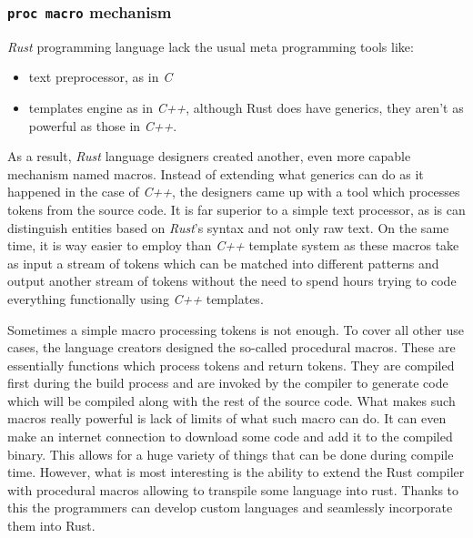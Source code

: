 \subsubsection{\texttt{proc macro} mechanism}
\textit{Rust} programming language lack the usual meta programming tools like:
\begin{itemize}
    \item text preprocessor, as in \textit{C}
    \item templates engine as in \textit{C++}, although Rust does have generics, they aren't as powerful as those in \textit{C++}.
\end{itemize}
As a result, \textit{Rust} language designers created another, even more capable mechanism named macros. Instead of extending what generics can do as it happened in the case of \textit{C++}, the designers came up with a tool which processes tokens from the source code. It is far superior to a simple text processor, as is can distinguish entities based on \textit{Rust}'s syntax and not only raw text. On the same time, it is way easier to employ than \textit{C++} template system as these macros take as input a stream of tokens which can be matched into different patterns and output another stream of tokens without the need to spend hours trying to code everything functionally using \textit{C++} templates. 

Sometimes a simple macro processing tokens is not enough. To cover all other use cases, the language creators designed the so-called procedural macros. These are essentially functions which process tokens and return tokens. They are compiled first during the build process and are invoked by the compiler to generate code which will be compiled along with the rest of the source code. What makes such macros really powerful is lack of limits of what such macro can do. It can even make an internet connection to download some code and add it to the compiled binary. This allows for a huge variety of things that can be done during compile time. However, what is most interesting is the ability to extend the Rust compiler with procedural macros allowing to transpile some language into rust. Thanks to this the programmers can develop custom languages and seamlessly incorporate them into Rust.

